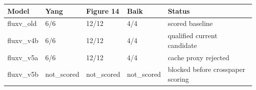 \begin{tabular}{lllll}
\toprule
Model & Yang & Figure 14 & Baik & Status \\
\midrule
fluxv\_old & 6/6 & 12/12 & 4/4 & scored baseline \\
fluxv\_v4b & 6/6 & 12/12 & 4/4 & qualified current candidate \\
fluxv\_v5a & 6/6 & 12/12 & 4/4 & cache proxy rejected \\
fluxv\_v5b & not_scored & not_scored & not_scored & blocked before crosspaper scoring \\
\bottomrule
\end{tabular}
